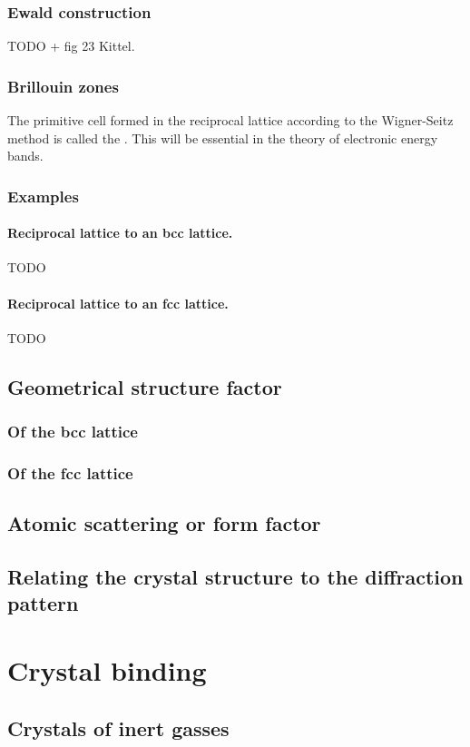 \subsection{Ewald construction}
TODO + fig 23 Kittel.
\subsection{Brillouin zones}
The primitive cell formed in the reciprocal lattice according to the Wigner-Seitz method is called the . This will be essential in the theory of electronic energy bands.
\subsection{Examples}
\subsubsection{Reciprocal lattice to an bcc lattice.} TODO
\subsubsection{Reciprocal lattice to an fcc lattice. } TODO

\section{Geometrical structure factor}
\subsection{Of the bcc lattice}
\subsection{Of the fcc lattice}
\section{Atomic scattering or form factor}
\section{Relating the crystal structure to the diffraction pattern}

\chapter{Crystal binding}
\section{Crystals of inert gasses}
